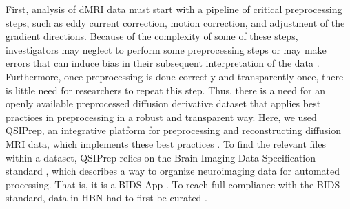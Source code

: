 \documentclass[fleqn,10pt]{wlscirep}
\begin{document}
First, analysis of dMRI data must start with a pipeline of critical
preprocessing steps, such as eddy current correction, motion correction, and
adjustment of the gradient directions. Because of the complexity of some of
these steps, investigators may neglect to perform some preprocessing steps or
may make errors that can induce bias in their subsequent interpretation of the
data \cite{jones2010-ps}. Furthermore, once preprocessing is done correctly and
transparently once, there is little need for researchers to repeat this step.
Thus, there is a need for an openly available preprocessed diffusion derivative
dataset that applies best practices in preprocessing in a robust and transparent
way. Here, we used QSIPrep, an integrative platform for preprocessing and
reconstructing diffusion MRI data, which implements these best practices
\cite{cieslak2021-iq}. To find the relevant files within a dataset, QSIPrep
relies on the Brain Imaging Data Specification standard \cite{gorgolewski2016},
which describes a way to organize neuroimaging data for automated processing.
That is, it is a BIDS App \cite{Gorgolewski2017-mb}. To reach full compliance with the BIDS standard, data in HBN had to first be curated .
\end{document}
